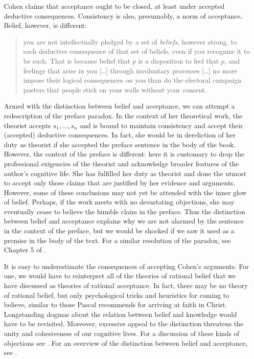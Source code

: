 Cohen claims that acceptance ought to be closed, at least under accepted
deductive consequences. Consistency is also, presumably, a norm of acceptance.
Belief, however, is different:
\begin{quote}
you are not intellectually pledged by a set of {\em beliefs}, however 
strong, to each deductive consequence of that set of beliefs, even if you 
recognize it to be such. That is because belief that $p$ is a disposition to 
feel that $p$, and feelings that arise in you [\ldots] through involuntary processes 
[\ldots] no more impose their logical consequences on you than do the electoral 
campaign posters that people stick on your walls without your consent. 
\citep[p. 31]{cohen1992essay}
\end{quote}

Armed with the distinction between belief and acceptance, we can attempt a
redescription of the preface paradox. In the context of her theoretical work,
the theorist accepts $s_1, \ldots, s_n$ and is bound to maintain consistency and
accept their (accepted) deductive consequences. In fact, she would be in
dereliction of her duty as theorist if she accepted the preface sentence in the
body of the book. However, the context of the preface is different: here it is
customary to drop the professional exigencies of the theorist and acknowledge
broader features of the author's cognitive life. She has fulfilled her duty as
theorist and done the utmost to accept only those claims that are justified by
her evidence and arguments. However, some of these conclusions may not yet be
attended with the inner glow of belief. Perhaps, if the work meets with no
devastating objections, she may eventually cease to believe the humble claim in
the preface. Thus the distinction between belief and acceptance explains why we
are not alarmed by the sentence in the context of the preface, but we would be
shocked if we saw it used as a premise in the body of the text. For a similar
resolution of the paradox, see Chapter 5 of \citet{stalnaker1984inquiry}.

It is easy to underestimate the consequences of accepting Cohen's arguments. For
one, we would have to reinterpret all of the theories of rational belief that we
have discussed as theories of rational acceptance. In fact, there may be no
theory of rational belief, but only psychological tricks and heuristics for
coming to believe, similar to those Pascal recommends for arriving at faith in
Christ. Longstanding dogmas about the relation between belief and knowledge
would have to be revisited. Moreover, excessive appeal to the distinction
threatens the unity and cohesiveness of our cognitive lives. For a discussion of
these kinds of objections see \citet{kvanvig2016intellectual}. For an overview
of the distinction between belief and acceptance, see \citet{weirich2004belief}.


